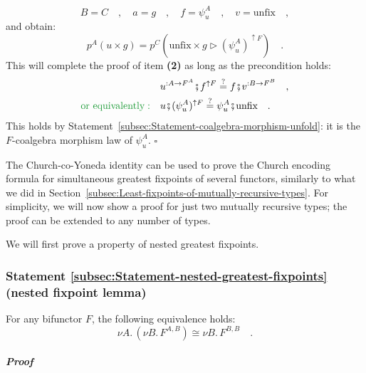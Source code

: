 \[
B=C\quad,\quad a=g\quad,\quad f=\psi_{u}^{A}\quad,\quad v=\text{unfix}\quad,
\]
and obtain:
\[
p^{A}(u\times g)=p^{C}(\text{unfix}\times g\triangleright(\psi_{u}^{A})^{\uparrow F})\quad.
\]
This will complete the proof of item \textbf{(2)} as long as the precondition
holds:
\begin{align*}
 & u^{:A\rightarrow F^{A}}\bef f^{\uparrow F}\overset{?}{=}f\bef v^{:B\rightarrow F^{B}}\quad,\\
{\color{greenunder}\text{or equivalently}:}\quad & u\bef(\psi_{u}^{A})^{\uparrow F}\overset{?}{=}\psi_{u}^{A}\bef\text{unfix}\quad.
\end{align*}
This holds by Statement~\ref{subsec:Statement-coalgebra-morphism-unfold}:
it is the $F$-coalgebra morphism law of $\psi_{u}^{A}$. $\square$

The Church-co-Yoneda identity can be used to prove the Church encoding
formula for simultaneous greatest fixpoints of several functors, similarly
to what we did in Section~\ref{subsec:Least-fixpoints-of-mutually-recursive-types}.
For simplicity, we will now show a proof for just two mutually recursive
types; the proof can be extended to any number of types. 

We will first prove a property of nested greatest fixpoints.

\subsubsection{Statement \label{subsec:Statement-nested-greatest-fixpoints}\ref{subsec:Statement-nested-greatest-fixpoints}
(nested fixpoint lemma)}

For any bifunctor $F$, the following equivalence
holds:
\[
\nu A.\,(\nu B.\,F^{A,B})\cong\nu B.\,F^{B,B}\quad.
\]


\subparagraph{Proof}

